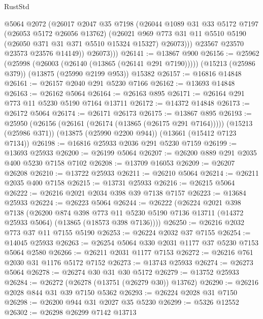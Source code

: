 \begin{lexlean}{RustStd}
\begin{coremodule}
              @5064
              @2072
              (@26017
                @2047
                @35
                @7198
                (@26044
                  @1089
                  @31
                  @33
                  @5172
                  @7197
                  (@26053 @5172 @26056 @13762)
                  (@26021
                    @969
                    @773
                    @31
                    @11
                    @5510
                    @5190
                    (@26050 @371 @31 @371 @5510 @15324 @15327)
                    @26073)))
              @23567
              @23570
              @23573
              @23576
              @14149))
          @26073)))
@26141 := @13867 @900
@26156 := @25962
    (@25998 (@26003 (@26140 (@13865 (@26141 @291 @7190)))))
    (@15213 (@25986 @379))
    (@13875 (@25990 @2199 @953))
    @15382
@26157 := @16816 @14848
@26161 := @26157 @2040 @291 @5230 @7166
@26162 := @13693 @14848
@26163 := @26162 @5064
@26164 := @26163 @895
@26171 := @26164 @291 @773 @11 @5230 @5190 @7164 @13711
@26172 := @14372 @14848
@26173 := @26172 @5064
@26174 := @26171 @26173
@26175 := @13867 @895
@26193 := @25950
    (@26156 (@26161 (@26174 (@13865 (@26175 @291 @7164)))))
    (@15213 (@25986 @371))
    (@13875 (@25990 @2200 @944))
    (@13661 (@15412 @7123 @7134))
@26198 := @16816 @25933 @2036 @291 @5230 @7159
@26199 := @13693 @25933
@26200 := @26199 @5064
@26207 := @26200 @889 @291 @2035 @400 @5230 @7158 @7102
@26208 := @13709 @16053
@26209 := @26207 @26208
@26210 := @13722 @25933
@26211 := @26210 @5064
@26214 := @26211 @2035 @400 @7158
@26215 := @13731 @25933
@26216 := @26215 @5064
@26222 := @26216 @2021 @2034 @398 @39 @7138 @7157
@26223 := @13684 @25933
@26224 := @26223 @5064
@26244 := @26222
    (@26224
      @2021
      @398
      @7138
      (@26200
        @874
        @398
        @773
        @11
        @5230
        @5190
        @7136
        @13711
        (@14372 @25933 @5064)
        (@13865 (@18573 @398 @7136))))
@26250 := @26216 @2032 @773 @37 @11 @7155 @5190
@26253 := @26224 @2032 @37 @7155
@26254 := @14045 @25933
@26263 := @26254 @5064 @330 @2031 @1177 @37 @5230 @7153 @5064 @2580
@26266 := @26211 @2031 @1177 @7153
@26272 := @26216 @761 @2030 @31 @1176 @5172 @7152
@26273 := @13743 @25933
@26274 := @26273 @5064
@26278 := @26274 @30 @31 @30 @5172
@26279 := @13752 @25933
@26284 := @26272 (@26278 (@13751 (@26279 @30)) @13762)
@26290 := @26216 @2028 @844 @31 @39 @7150 @5362
@26293 := @26224 @2028 @31 @7150
@26298 := @26200 @944 @31 @2027 @35 @5230
@26299 := @5326 @12552
@26302 := @26298 @26299 @7142 @13713

\end{coremodule}
\end{lexlean}
